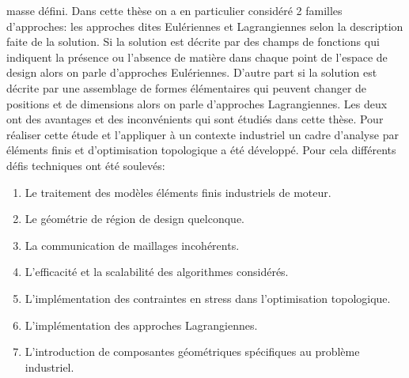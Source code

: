 \begin{mdframed}[hidealllines=true,backgroundcolor=lightgray!20]
masse défini. Dans cette thèse on a en particulier considéré 2 familles d'approches: les approches dites Eulériennes et Lagrangiennes \cite{zhang2016lagrangian} selon la description faite de la solution. Si la solution est décrite par des champs de fonctions qui indiquent la présence ou l'absence de matière dans chaque point de l'espace de design alors on parle d'approches Eulériennes. D'autre part si la solution est décrite par une assemblage de formes élémentaires qui peuvent changer de positions et de dimensions alors on parle d'approches Lagrangiennes. Les deux ont des avantages et des inconvénients qui sont étudiés dans cette thèse. Pour réaliser cette étude et l'appliquer à un contexte industriel un cadre d'analyse par éléments finis et d'optimisation topologique a été développé. Pour cela différents défis techniques ont été soulevés:
\begin{enumerate}
\item Le traitement des modèles éléments finis industriels de moteur. 
\item Le géométrie de région de design quelconque.
\item La communication de maillages incohérents.
\item L'efficacité et la scalabilité des algorithmes considérés.
\item L'implémentation des contraintes en stress dans l'optimisation topologique. 
\item L'implémentation des approches Lagrangiennes.
\item L'introduction de composantes géométriques spécifiques au problème industriel. 
\end{enumerate} 
\end{mdframed}

